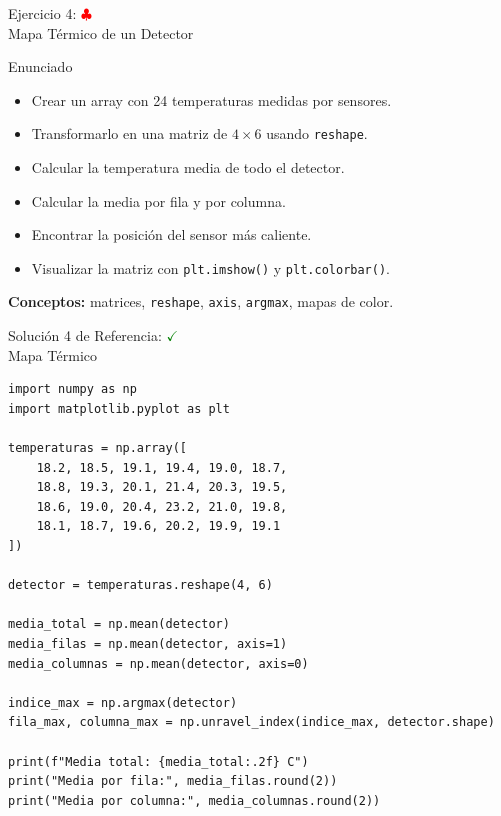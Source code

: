 \documentclass[10pt]{beamer}
\begin{document}
\begin{frame}{Ejercicio 4: \hfill \textcolor{red}{$\clubsuit$} \\ Mapa Térmico de un Detector}
  \begin{block}{Enunciado}
    \begin{itemize}
      \item Crear un array con 24 temperaturas medidas por sensores.
      \item Transformarlo en una matriz de \(4\times 6\) usando \texttt{reshape}.
      \item Calcular la temperatura media de todo el detector.
      \item Calcular la media por fila y por columna.
      \item Encontrar la posición del sensor más caliente.
      \item Visualizar la matriz con \texttt{plt.imshow()} y \texttt{plt.colorbar()}.
    \end{itemize}
  \end{block}
  \textbf{Conceptos:} matrices, \texttt{reshape}, \texttt{axis}, \texttt{argmax}, mapas de color.
\end{frame}

\begin{solutionblock}
\begin{frame}[fragile]{Solución 4 de Referencia: \hfill \textcolor{green}{$\checkmark$} \\ Mapa Térmico}
\begin{Verbatim}[fontsize=\tiny]
import numpy as np
import matplotlib.pyplot as plt

temperaturas = np.array([
    18.2, 18.5, 19.1, 19.4, 19.0, 18.7,
    18.8, 19.3, 20.1, 21.4, 20.3, 19.5,
    18.6, 19.0, 20.4, 23.2, 21.0, 19.8,
    18.1, 18.7, 19.6, 20.2, 19.9, 19.1
])

detector = temperaturas.reshape(4, 6)

media_total = np.mean(detector)
media_filas = np.mean(detector, axis=1)
media_columnas = np.mean(detector, axis=0)

indice_max = np.argmax(detector)
fila_max, columna_max = np.unravel_index(indice_max, detector.shape)

print(f"Media total: {media_total:.2f} C")
print("Media por fila:", media_filas.round(2))
print("Media por columna:", media_columnas.round(2))
\end{Verbatim}
\end{frame}
\end{solutionblock}
\end{document}
